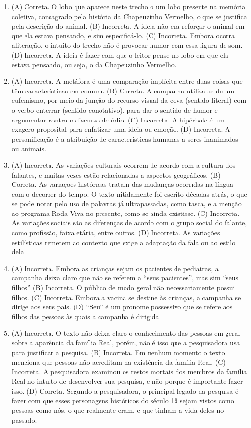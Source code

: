 \begin{enumerate}
\item (A) Correta. O lobo que aparece neste trecho o um lobo presente na
memória coletiva, consagrado pela história da Chapeuzinho Vermelho, o
que se justifica pela descrição do animal.
(B) Incorreta. A ideia não era reforçar o animal em que ela estava
pensando, e sim especificá-lo.
(C) Incorreta. Embora ocorra aliteração, o intuito do trecho não é
provocar humor com essa figura de som.
(D) Incorreta. A ideia é fazer com que o leitor pense no lobo em que ela
estava pensando, ou seja, o da Chapeuzinho Vermelho.

\item (A) Incorreta. A metáfora é uma comparação implícita entre duas coisas
que têm características em comum.
(B) Correta. A campanha utiliza-se de um eufemismo, por meio da junção do
recurso visual da cova (sentido literal) com o verbo enterrar (sentido
conotativo), para dar o sentido de humor e argumentar contra o discurso
de ódio.
(C) Incorreta. A hipérbole é um exagero proposital para enfatizar uma
ideia ou emoção.
(D) Incorreta. A personificação é a atribuição de características humanas
a seres inanimados ou animais.

\item (A) Incorreta. As variações culturais ocorrem de acordo com a cultura dos
falantes, e muitas vezes estão relacionadas a aspectos geográficos.
(B) Correta. As variações históricas tratam das mudanças ocorridas na
língua com o decorrer do tempo. O texto nitidamente foi escrito décadas
atrás, o que se pode notar pelo uso de palavras já ultrapassadas, como
tasca, e a menção ao programa Roda Viva no presente, como se ainda
existisse.
(C) Incorreta. As variações sociais são as diferenças de acordo com o
grupo social do falante, como profissão, faixa etária, entre outros.
(D) Incorreta. As variações estilísticas remetem ao contexto que exige a
adaptação da fala ou ao estilo dela.

\item (A) Incorreta. Embora as crianças sejam os pacientes de pediatras, a
campanha deixa claro que não se referem a ``seus pacientes'', mas sim
``seus filhos''
(B) Incorreta. O público de modo geral não necessariamente possui filhos.
(C) Incorreta. Embora a vacina se destine às crianças, a campanha se
dirige aos seus pais.
(D) ``Seu'' é um pronome possessivo que se refere aos filhos das pessoas
às quais a campanha é dirigida

\item (A) Incorreta. O texto não deixa claro o conhecimento das pessoas em
geral sobre a aparência da família Real, porém, não é isso que a
pesquisadora usa para justificar a pesquisa.
(B) Incorreta. Em nenhum momento o texto menciona que pessoas não
acreditam na existência da família Real.
(C) Incorreta. A pesquisadora examinou os restos mortais dos membros da
família Real no intuito de desenvolver sua pesquisa, e não porque é
importante fazer isso.
(D) Correta. Segundo a pesquisadora, o principal legado da pesquisa é
fazer com que esses personagens históricos do século 19 sejam vistos
como pessoas como nós, o que realmente eram, e que tinham a vida deles
no passado.


\end{enumerate}
